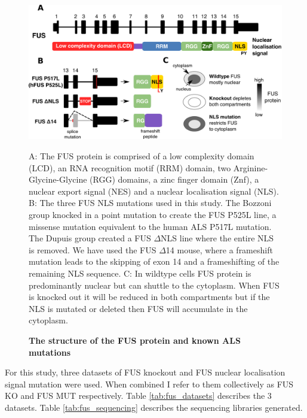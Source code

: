 \begin{figure}[h!]
	\centering
	\includegraphics[width=\textwidth]{Figures/06_fus_meta/FUS_structure_mutations.png}
	\caption{\textbf{The structure of the FUS protein and known ALS mutations}}
	A: The FUS protein is comprised of a low complexity domain (LCD), an RNA recognition motif (RRM) domain, two Arginine-Glycine-Glycine (RGG) domains, a zinc finger domain (Znf), a nuclear export signal (NES) and a nuclear localisation signal (NLS). 
	B: The three FUS NLS mutations used in this study. The Bozzoni group knocked in a point mutation to create the FUS P525L line, a missense mutation equivalent to the human ALS P517L mutation.  
	The Dupuis group created a FUS $\Delta$NLS line where the entire NLS is removed.  
	We have used the FUS $\Delta$14 mouse, where a frameshift mutation leads to the skipping of exon 14 and a frameshifting of the remaining NLS sequence.
	C: In wildtype  cells FUS protein is predominantly nuclear but can shuttle to the cytoplasm. When FUS is knocked out it will be reduced in both compartments but if the NLS is mutated or deleted then FUS will accumulate in the cytoplasm.
	
	\label{fig:fus_structure}
\end{figure}


For this study, three datasets of FUS knockout and FUS nuclear localisation signal mutation were used. When combined I refer to them collectively as FUS KO and FUS MUT respectively. Table \ref{tab:fus_datasets} describes the 3 datasets. Table \ref{tab:fus_sequencing} describes the sequencing libraries generated.


